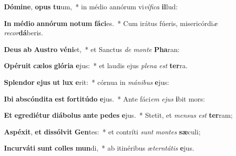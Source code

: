 \item \textbf{Dó}\textbf{mi}\textbf{ne}, \textbf{o}\textbf{pus} \textbf{tu}um,~* in médio annórum vi\textit{ví}\textit{fi}\textit{ca} \textbf{il}lud:
\item \textbf{In} \textbf{mé}\textbf{di}\textbf{o} \textbf{an}\textbf{nó}\textbf{rum} \textbf{no}\textbf{tum} \textbf{fá}\textbf{ci}es.~* Cum irátus fúeris, misericórdi\textit{æ} \textit{re}\textit{cor}\textbf{dá}beris.
\item \textbf{De}\textbf{us} \textbf{ab} \textbf{Aus}\textbf{tro} \textbf{vé}\textbf{ni}et,~* et Sanctus \textit{de} \textit{mon}\textit{te} \textbf{Pha}ran:
\item \textbf{O}\textbf{pé}\textbf{ru}\textbf{it} \textbf{cæ}\textbf{los} \textbf{gló}\textbf{ri}\textbf{a} \textbf{e}jus:~* et laudis ejus \textit{ple}\textit{na} \textit{est} \textbf{ter}ra.
\item \textbf{Splen}\textbf{dor} \textbf{e}\textbf{jus} \textbf{ut} \textbf{lux} \textbf{e}rit:~* córnua in \textit{má}\textit{ni}\textit{bus} \textbf{e}jus:
\item \textbf{I}\textbf{bi} \textbf{abs}\textbf{cón}\textbf{di}\textbf{ta} \textbf{est} \textbf{for}\textbf{ti}\textbf{tú}\textbf{do} \textbf{e}jus.~* Ante fáci\textit{em} \textit{e}\textit{jus} \textbf{i}bit mors:
\item \textbf{Et} \textbf{e}\textbf{gre}\textbf{di}\textbf{é}\textbf{tur} \textbf{di}\textbf{á}\textbf{bo}\textbf{lus} \textbf{an}\textbf{te} \textbf{pe}\textbf{des} \textbf{e}jus.~* Stetit, et \textit{men}\textit{sus} \textit{est} \textbf{ter}ram;
\item \textbf{A}\textbf{spé}\textbf{xit}, \textbf{et} \textbf{dis}\textbf{sól}\textbf{vit} \textbf{Gen}tes:~* et contríti \textit{sunt} \textit{mon}\textit{tes} \textbf{sæ}culi;
\item \textbf{In}\textbf{cur}\textbf{vá}\textbf{ti} \textbf{sunt} \textbf{col}\textbf{les} \textbf{mun}di,~* ab itinéribus æ\textit{tern}\textit{tá}\textit{tis} \textbf{e}jus.
